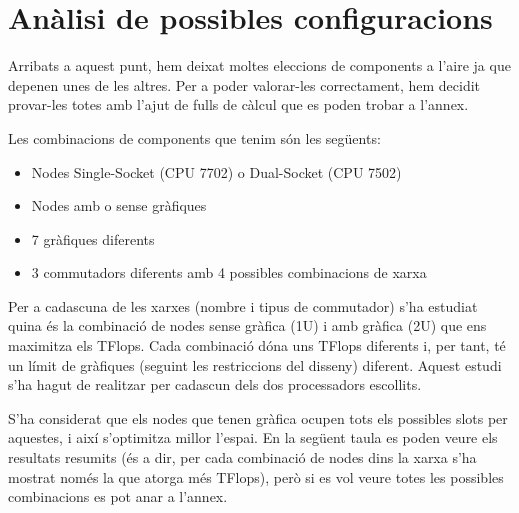 \section{Anàlisi de possibles configuracions}

Arribats a aquest punt, hem deixat moltes eleccions de components a l'aire ja que depenen unes de les altres. Per a poder valorar-les correctament, hem decidit provar-les totes amb l'ajut de fulls de càlcul que es poden trobar a l'annex.

Les combinacions de components que tenim són les següents:
\begin{itemize}
    \item {Nodes Single-Socket (CPU 7702) o Dual-Socket (CPU 7502)}
    \item {Nodes amb o sense gràfiques}
    \item {7 gràfiques diferents}
    \item {3 commutadors diferents amb 4 possibles combinacions de xarxa}
\end{itemize}



Per a cadascuna de les xarxes (nombre i tipus de commutador) s'ha estudiat quina és la combinació de nodes sense gràfica (1U) i amb gràfica (2U) que ens maximitza els TFlops. Cada combinació dóna uns TFlops diferents i, per tant, té un límit de gràfiques (seguint les restriccions del disseny) diferent. Aquest estudi s'ha hagut de realitzar per cadascun dels dos processadors escollits.

S'ha considerat que els nodes que tenen gràfica ocupen tots els possibles slots per aquestes, i així s'optimitza millor l'espai. En la següent taula es poden veure els resultats resumits (és a dir, per cada combinació de nodes dins la xarxa s'ha mostrat només la que atorga més TFlops), però si es vol veure totes les possibles combinacions es pot anar a l'annex.

